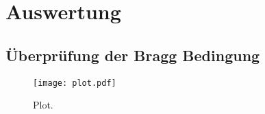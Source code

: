\section{Auswertung}
\label{sec:Auswertung}

\subsection{Überprüfung der Bragg Bedingung}




\begin{figure}
  \centering
  \texttt{[image: plot.pdf]}
  \caption{Plot.}
  \label{fig:plot}
\end{figure}
